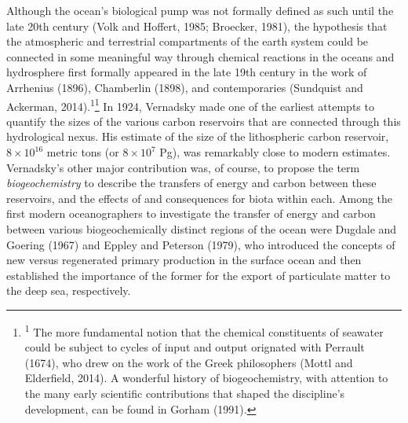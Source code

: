 Although the ocean's biological pump was not formally defined as such until the late 20th century (Volk and Hoffert, 1985; Broecker, 1981), the hypothesis that the atmospheric and terrestrial compartments of the earth system could be connected in some meaningful way through chemical reactions in the oceans and hydrosphere first formally appeared in the late 19th century in the work of Arrhenius (1896), Chamberlin (1898), and contemporaries (Sundquist and Ackerman, 2014).\textsuperscript{1}\let\thefootnote\relax\footnote{{\setlength{\parindent}{0pt}\textsuperscript{1} The more fundamental notion that the chemical constituents of seawater could be subject to cycles of input and output orignated with Perrault (1674), who drew on the work of the Greek philosophers (Mottl and Elderfield, 2014). A wonderful history of biogeochemistry, with attention to the many early scientific contributions that shaped the discipline's development, can be found in Gorham (1991).}} In 1924, Vernadsky made one of the earliest attempts to quantify the sizes of the various carbon reservoirs that are connected through this hydrological nexus. His estimate of the size of the lithospheric carbon reservoir, $8\times10^{16}$ metric tons (or $8\times10^7$ Pg), was remarkably close to modern estimates. Vernadsky's other major contribution was, of course, to propose the term \emph{biogeochemistry} to describe the transfers of energy and carbon between these reservoirs, and the effects of and consequences for biota within each. Among the first modern oceanographers to investigate the transfer of energy and carbon between various biogeochemically distinct regions of the ocean were Dugdale and Goering (1967) and Eppley and Peterson (1979), who introduced the concepts of new versus regenerated primary production in the surface ocean and then established the importance of the former for the export of particulate matter to the deep sea, respectively.


